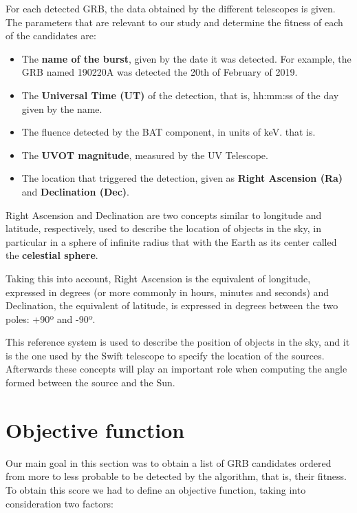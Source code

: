 For each detected GRB, the data obtained by the different telescopes is given. The parameters that are relevant to our study and determine the fitness of each of the candidates are:

\begin{itemize}
\item The \textbf{name of the burst}, given by the date it was detected. For example, the GRB named 190220A was detected the 20th of February of 2019.
\item The \textbf{Universal Time (UT)} of the detection, that is, hh:mm:ss of the day given by the name.
\item The fluence detected by the BAT component, in units of keV. that is.
\item The \textbf{UVOT magnitude}, measured by the UV Telescope.
\item The location that triggered the detection, given as  \textbf{Right Ascension (Ra)} and \textbf{Declination (Dec)}.
\end{itemize}

Right Ascension and Declination are two concepts similar to longitude and latitude, respectively, used to describe the location of objects in the sky, in particular in a sphere of infinite radius that with the Earth as its center called the \textbf{celestial sphere}.

Taking this into account, Right Ascension is the equivalent of longitude, expressed in degrees (or more commonly in hours, minutes and seconds) and Declination, the equivalent of latitude, is expressed in degrees between the two poles: +90º and -90º. \cite{nasareferencesystem}

This reference system is used to describe the position of objects in the sky, and it is the one used by the Swift telescope to specify the location of the sources. Afterwards these concepts will play an important role when computing the angle formed between the source and the Sun.

\section{Objective function}

Our main goal in this section was to obtain a list of GRB candidates ordered from more to less probable to be detected by the algorithm, that is, their fitness. To obtain this score we had to define an objective function, taking into consideration two factors:

